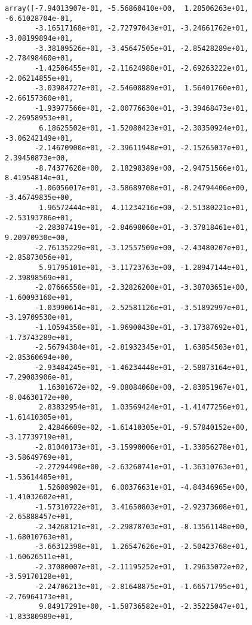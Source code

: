 \documentclass[11pt]{article}
\makeatletter
\newcommand{\boxspacing}{\kern\kvtcb@left@rule\kern\kvtcb@boxsep}
\newcommand{\prompt}[4]{
        {\ttfamily\llap{{\color{#2}[#3]:\hspace{3pt}#4}}\vspace{-\baselineskip}}
    }
\makeatother
\begin{document}
            \begin{tcolorbox}[breakable, size=fbox, boxrule=.5pt, pad at break*=1mm, opacityfill=0]
\prompt{Out}{outcolor}{29}{\boxspacing}
\begin{Verbatim}[commandchars=\\\{\}]
array([-7.94013907e-01, -5.56860410e+00,  1.28506263e+01, -6.61028704e-01,
       -3.16517168e+01, -2.72797043e+01, -3.24661762e+01, -3.08199894e+01,
       -3.38109526e+01, -3.45647505e+01, -2.85428289e+01, -2.78498460e+01,
       -1.42506455e+01, -2.11624988e+01, -2.69263222e+01, -2.06214855e+01,
       -3.03984727e+01, -2.54608889e+01,  1.56401760e+01, -2.66157360e+01,
       -1.93977566e+01, -2.00776630e+01, -3.39468473e+01, -2.26958953e+01,
        6.18625502e+01, -1.52080423e+01, -2.30350924e+01, -3.06242149e+01,
       -2.14670900e+01, -2.39611948e+01, -2.15265037e+01,  2.39450873e+00,
       -8.74377620e+00,  2.18298389e+00, -2.94751566e+01,  8.41954814e+01,
       -1.06056017e+01, -3.58689708e+01, -8.24794406e+00, -3.46749835e+00,
        1.96572444e+01,  4.11234216e+00, -2.51380221e+01, -2.53193786e+01,
       -2.28387419e+01, -2.84698060e+01, -3.37818461e+01,  9.20970930e+00,
       -2.76135229e+01, -3.12557509e+00, -2.43480207e+01, -2.85873056e+01,
        5.91795101e+01, -3.11723763e+00, -1.28947144e+01, -2.39898569e+01,
       -2.07666550e+01, -2.32826200e+01, -3.38703651e+00, -1.60093160e+01,
       -1.03990614e+01, -2.52581126e+01, -3.51892997e+01, -3.19709530e+01,
       -1.10594350e+01, -1.96900438e+01, -3.17387692e+01, -1.73743289e+01,
       -2.56794384e+01, -2.81932345e+01,  1.63854503e+01, -2.85360694e+00,
       -2.93484245e+01, -1.46234448e+01, -2.58873164e+01, -7.29083906e-01,
        1.16301672e+02, -9.08084068e+00, -2.83051967e+01, -8.04630172e+00,
        2.83832954e+01,  1.03569424e+01, -1.41477256e+01, -1.61410305e+01,
        2.42846609e+02, -1.61410305e+01, -9.57840152e+00, -3.17739719e+01,
       -2.81040173e+01, -3.15990006e+01, -1.33056278e+01, -3.58649769e+01,
       -2.27294490e+00, -2.63260741e+01, -1.36310763e+01, -1.53614485e+01,
        1.52608902e+01,  6.00376631e+01, -4.84346965e+00, -1.41032602e+01,
       -1.57310722e+01,  3.41650803e+01, -2.92373608e+01, -2.65888457e+01,
       -2.34268121e+01, -2.29878703e+01, -8.13561148e+00, -1.68010763e+01,
       -3.66312398e+01,  1.26547626e+01, -2.50423768e+01, -1.60626511e+01,
       -2.37080007e+01, -2.11195252e+01,  1.29635072e+02, -3.59170128e+01,
       -2.24706213e+01, -2.81648875e+01, -1.66571795e+01, -2.76964173e+01,
        9.84917291e+00, -1.58736582e+01, -2.35225047e+01, -1.83380989e+01,

\end{Verbatim}
\end{tcolorbox}
\end{document}
